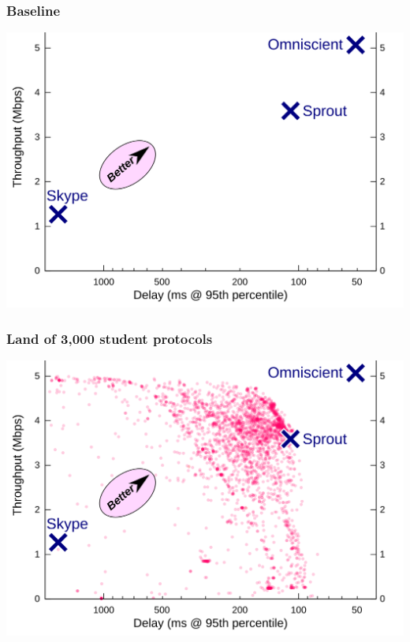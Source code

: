 \documentclass[svgnames]{beamer}
\begin{document}
\begin{frame}
\frametitle{Baseline}

\begin{centering}
\includegraphics[width=0.9\columnwidth]{pointplot-nostudents.png}

\end{centering}

\end{frame}

\begin{frame}
\frametitle{Land of 3,000 student protocols}

\begin{centering}
\includegraphics[width=0.9\columnwidth]{pointplot.png}

\end{centering}

\end{frame}
\end{document}
